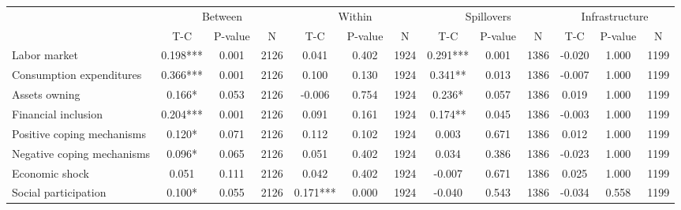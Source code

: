 
\begin{tabular}{l*{12}{c}}\hline&\multicolumn{3}{c}{Between}&\multicolumn{3}{c}{Within}&\multicolumn{3}{c}{Spillovers}&\multicolumn{3}{c}{Infrastructure} \\ \cmidrule(r){2-4}\cmidrule(l){5-7}\cmidrule(l){8-10}\cmidrule(l){9-13} & {T-C} & {P-value} & {N} & {T-C} & {P-value} & {N}  & {T-C} & {P-value} & {N} & {T-C} & {P-value} & {N} \\ \midrule

 Labor market &        0.198*** &        0.001 & 2126    &        0.041 &        0.402 & 1924    &        0.291*** &        0.001 & 1386 &       -0.020 &        1.000 & 1199 \\ 

 Consumption expenditures &        0.366*** &        0.001 & 2126    &        0.100 &        0.130 & 1924    &        0.341** &        0.013 & 1386 &       -0.007 &        1.000 & 1199 \\ 

 Assets owning &        0.166* &        0.053 & 2126    &       -0.006 &        0.754 & 1924    &        0.236* &        0.057 & 1386 &        0.019 &        1.000 & 1199 \\ 

 Financial inclusion &        0.204*** &        0.001 & 2126    &        0.091 &        0.161 & 1924    &        0.174** &        0.045 & 1386 &       -0.003 &        1.000 & 1199 \\ 

 Positive coping mechanisms &        0.120* &        0.071 & 2126    &        0.112 &        0.102 & 1924    &        0.003 &        0.671 & 1386 &        0.012 &        1.000 & 1199 \\ 

 Negative coping mechanisms &        0.096* &        0.065 & 2126    &        0.051 &        0.402 & 1924    &        0.034 &        0.386 & 1386 &       -0.023 &        1.000 & 1199 \\ 

 Economic shock &        0.051 &        0.111 & 2126    &        0.042 &        0.402 & 1924    &       -0.007 &        0.671 & 1386 &        0.025 &        1.000 & 1199 \\ 

 Social participation &        0.100* &        0.055 & 2126    &        0.171*** &        0.000 & 1924    &       -0.040 &        0.543 & 1386 &       -0.034 &        0.558 & 1199 \\ 


\end{tabular}
